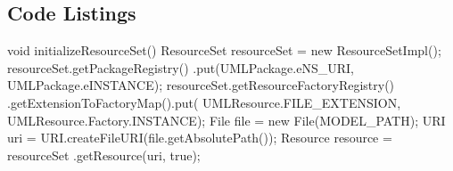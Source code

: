 \documentclass{llncs}
\begin{document}
\subsection{Code Listings}
\label{sec:applistings}

\begin{lstsingle}[language=Java,caption=Initializing the resourceset,label=lst:resourceset]
void initializeResourceSet() {
  ResourceSet resourceSet = new ResourceSetImpl();
  resourceSet.getPackageRegistry()
    .put(UMLPackage.eNS_URI, UMLPackage.eINSTANCE);
  resourceSet.getResourceFactoryRegistry()
    .getExtensionToFactoryMap().put(
      UMLResource.FILE_EXTENSION, 
      UMLResource.Factory.INSTANCE);
  File file = new File(MODEL_PATH);
  URI uri = URI.createFileURI(file.getAbsolutePath());
  Resource resource = resourceSet
    .getResource(uri, true);
}
\end{lstsingle}
\\
\end{document}
